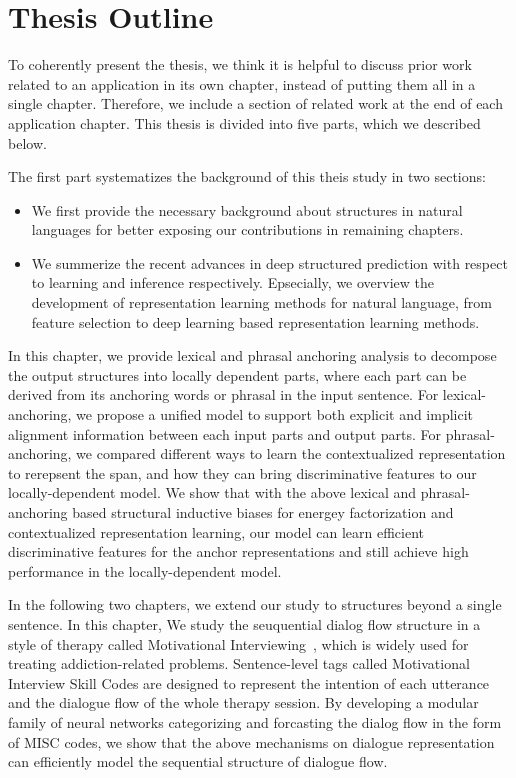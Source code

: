 
\section{Thesis Outline}
\label{sec:intro:roadmap}
To coherently present the thesis, we think it is helpful to discuss
prior work related to an application in its own chapter, instead of
putting them all in a single chapter. Therefore, we include a section
of related work at the end of each application chapter. This thesis is
divided into five parts, which we described below.

 The first part systematizes the
background of this theis study in two sections:
\begin{itemize}
\item {} We first provide the necessary
  background about structures in natural languages for better exposing
  our contributions in remaining chapters.
\item {} We summerize
  the recent advances in deep structured prediction with respect to
  learning and inference respectively. Epsecially, we overview the
  development of representation learning methods for natural language,
  from feature selection to deep learning based representation
  learning methods.
\end{itemize}

 In this chapter, we provide lexical and phrasal
anchoring analysis to decompose the output structures into locally
dependent parts, where each part can be derived from its anchoring
words or phrasal in the input sentence. For lexical-anchoring, we
propose a unified model to support both explicit and implicit
alignment information between each input parts and output parts. For
phrasal-anchoring, we compared different ways to learn the
contextualized representation to rerepsent the span, and how they can
bring discriminative features to our locally-dependent model. We show
that with the above lexical and phrasal-anchoring based structural
inductive biases for energey factorization and contextualized
representation learning, our model can learn efficient discriminative
features for the anchor representations and still achieve high
performance in the locally-dependent model.

 In the following two chapters, we extend our study to
structures beyond a single sentence. In this chapter, We study the
seuquential dialog flow structure in a style of therapy called
Motivational
Interviewing~\cite[MI,][]{miller2003motivational,miller2012motivational},
which is widely used for treating addiction-related problems.
Sentence-level tags called Motivational Interview Skill Codes are
designed to represent the intention of each utterance and the dialogue
flow of the whole therapy session. By developing a modular family of
neural networks categorizing and forcasting the dialog flow in the
form of MISC codes, we show that the above mechanisms on dialogue
representation can efficiently model the sequential structure of
dialogue flow.

